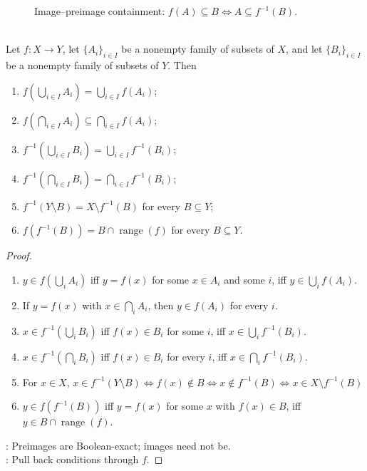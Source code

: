   \begin{figure}[H]
  \centering
  
  \caption{Image--preimage containment: $f(A)\subseteq B \Longleftrightarrow A\subseteq f^{-1}(B)$.}
  \label{fig:function-image-preimage}
\end{figure}

\begin{proposition} \label{prop:image-preimage-calculus} \\
Let $f:X\to Y$, let $\{A_i\}_{i\in I}$ be a nonempty family of subsets of $X$, and let $\{B_i\}_{i\in I}$ be a nonempty family of subsets of $Y$. Then
\begin{enumerate}[label=(\roman*)]
\setlength{\itemsep}{0pt}
\item $f\left(\bigcup_{i\in I}A_i\right)=\bigcup_{i\in I}f(A_i)$;
\item $f\left(\bigcap_{i\in I}A_i\right)\subseteq\bigcap_{i\in I}f(A_i)$;
\item $f^{-1}\left(\bigcup_{i\in I}B_i\right)=\bigcup_{i\in I}f^{-1}(B_i)$;
\item $f^{-1}\left(\bigcap_{i\in I}B_i\right)=\bigcap_{i\in I}f^{-1}(B_i)$;
\item $f^{-1}(Y\setminus B)=X\setminus f^{-1}(B)$ for every $B\subseteq Y$;
\item $f(f^{-1}(B))=B\cap\operatorname{range}(f)$ for every $B\subseteq Y$.
\end{enumerate}
\begin{proof}
\begin{enumerate}[label=(\roman*)]
\setlength{\itemsep}{0pt}
\item $y\in f(\bigcup_i A_i)$ iff $y=f(x)$ for some $x\in A_i$ and some $i$, iff $y\in\bigcup_i f(A_i)$.
\item If $y=f(x)$ with $x\in\bigcap_i A_i$, then $y\in f(A_i)$ for every $i$.
\item $x\in f^{-1}(\bigcup_i B_i)$ iff $f(x)\in B_i$ for some $i$, iff $x\in\bigcup_i f^{-1}(B_i)$.
\item $x\in f^{-1}(\bigcap_i B_i)$ iff $f(x)\in B_i$ for every $i$, iff $x\in\bigcap_i f^{-1}(B_i)$.
\item For $x\in X$, $x\in f^{-1}(Y\setminus B) \Longleftrightarrow f(x)\notin B \Longleftrightarrow x\notin f^{-1}(B) \Longleftrightarrow x\in X\setminus f^{-1}(B)$
\item $y\in f(f^{-1}(B))$ iff $y=f(x)$ for some $x$ with $f(x)\in B$, iff $y\in B\cap\operatorname{range}(f)$.
\end{enumerate}
: Preimages are Boolean-exact; images need not be.\\
: Pull back conditions through $f$.
\end{proof}
\end{proposition}

